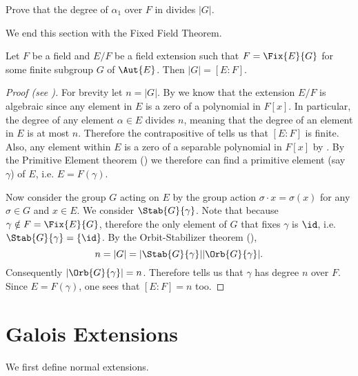 \begin{exercise}\label{exercise-degree-of-element-under-fixed-field-action}
    Prove that the degree of $\alpha_1$ over $F$ in  divides $|G|$.
\end{exercise}

We end this section with the Fixed Field Theorem.

\begin{theorem}\label{thrm-fixed-field}
    Let $F$ be a field and $E/F$ be a field extension such that $F = \Fix{E}{G}$ for some finite subgroup $G$ of $\Aut{E}$. Then $|G| = [E:F]$.
\end{theorem}
\begin{proof}[Proof (see {\cite[Theorem 16.5.4]{artin_2011}})]
    For brevity let $n = |G|$. By  we know that the extension $E/F$ is algebraic since any element in $E$ is a zero of a polynomial in $F[x]$. In particular, the degree of any element $\alpha \in E$ divides $n$, meaning that the degree of an element in $E$ is at most $n$. Therefore the contrapositive of  tells us that $[E:F]$ is finite. Also, any element within $E$ is a zero of a separable polynomial in $F[x]$ by . By the Primitive Element theorem () we therefore can find a primitive element (say $\gamma$) of $E$, i.e. $E = F(\gamma)$.

    Now consider the group $G$ acting on $E$ by the group action $\sigma\cdot x = \sigma(x)$ for any $\sigma \in G$ and $x \in E$. We consider $\Stab{G}{\gamma}$. Note that because $\gamma \notin F = \Fix{E}{G}$, therefore the only element of $G$ that fixes $\gamma$ is $\id$, i.e. $\Stab{G}{\gamma} = \{\id\}$. By the Orbit-Stabilizer theorem (),
    \[
        n = |G| = |\Stab{G}{\gamma}||\Orb{G}{\gamma}|.
    \]
    Consequently $|\Orb{G}{\gamma}| = n$. Therefore  tells us that $\gamma$ has degree $n$ over $F$. Since $E = F(\gamma)$, one sees that $[E:F] = n$ too.
\end{proof}

\section{Galois Extensions}
We first define normal extensions.

